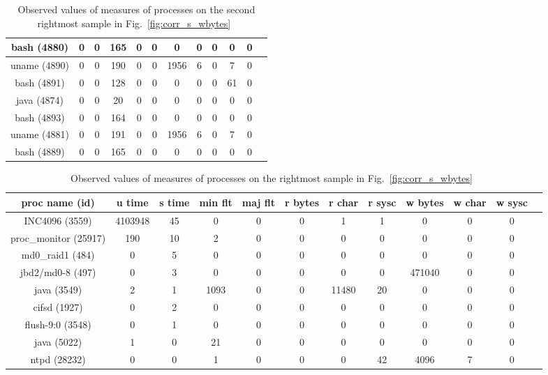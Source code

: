 \begin{table}[htp!]
\begin{center}
\begin{tabular}{|c|c|c|c|c|c|c|c|c|c|c|c|}
bash (4880) & 0 & 0 & 165 & 0 & 0 & 0 & 0 & 0 & 0 & 0 \\ \hline
uname (4890)  & 0 & 0 & 190 & 0 & 0 & 1956  & 6 & 0 & 7 & 0 \\ \hline
bash (4891) & 0 & 0 & 128 & 0 & 0 & 0 & 0 & 0 & 61 & 0 \\ \hline
java  (4874) & 0 & 0 & 20 & 0 & 0 & 0 & 0 & 0 & 0 & 0 \\ \hline
bash (4893) & 0 & 0 & 164 & 0 & 0 & 0 & 0 & 0 & 0 & 0 \\ \hline
uname (4881)  & 0 & 0 & 191 & 0 & 0 & 1956  & 6 & 0 & 7 & 0 \\ \hline
bash (4889) & 0 & 0 & 165 & 0 & 0 & 0 & 0 & 0 & 0 & 0 \\ \hline
\end{tabular}
\end{center}
\caption{Observed values of measures of processes on the second rightmost sample in Fig.~\ref{fig:corr_s_wbytes}~\label{tab:breakdown5}}
\end{table}

\begin{table}[htp!]
\begin{center}
\begin{tabular}{|c|c|c|c|c|c|c|c|c|c|c|c|} \hline
proc name (id) & u time & s time & min flt & maj flt & r bytes & r char & r sysc & w bytes & w char & w sysc\\ \hline
INC4096 (3559) & 4103948 & 45 & 0 & 0 & 0 & 1 & 1 & 0 & 0 & 0 \\ \hline
proc\_monitor (25917) & 190 & 10 & 2 & 0 & 0 & 0 & 0 & 0 & 0 & 0 \\ \hline
md0\_raid1 (484) & 0 & 5 & 0 & 0 & 0 & 0 & 0 & 0 & 0 & 0 \\ \hline
jbd2/md0-8 (497) & 0 & 3 & 0 & 0 & 0 & 0 & 0 & 471040 & 0 & 0 \\ \hline
java (3549) & 2 & 1 & 1093 & 0 & 0 & 11480 & 20 & 0 & 0 & 0 \\ \hline
cifsd (1927) & 0 & 2 & 0 & 0 & 0 & 0 & 0 & 0 & 0 & 0 \\ \hline
flush-9:0 (3548) & 0 & 1 & 0 & 0 & 0 & 0 & 0 & 0 & 0 & 0 \\ \hline
java (5022) & 1 & 0 & 21 & 0 & 0 & 0 & 0 & 0 & 0 & 0 \\ \hline
ntpd (28232) & 0 & 0 & 1 & 0 & 0 & 0 & 42 & 4096 & 7 & 0 \\ \hline
\end{tabular}
\end{center}
\caption{Observed values of measures of processes on the rightmost sample in Fig.~\ref{fig:corr_s_wbytes}~\label{tab:breakdown6}}
\end{table}

\clearpage
\pagebreak